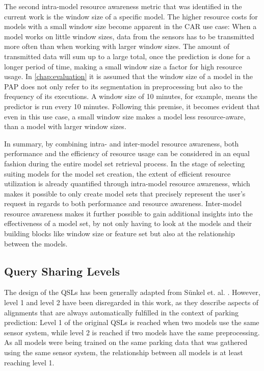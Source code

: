 The second intra-model resource awareness metric that was identified in the current work is the window size of a specific model. The higher resource costs for models with a small window size become apparent in the CAR use case: When a model works on little window sizes, data from the sensors has to be transmitted more often than when working with larger window sizes. The amount of transmitted data will sum up to a large total, once the prediction is done for a longer period of time, making a small window size a factor for high resource usage. In \autoref{chap:evaluation} it is assumed that the window size of a model in the PAP does not only refer to its segmentation in preprocessing but also to the frequency of its executions. A window size of 10 minutes, for example, means the predictor is run every 10 minutes. Following this premise, it becomes evident that even in this use case, a small window size makes a model less resource-aware, than a model with larger window sizes. 

In summary, by combining intra- and inter-model resource awareness, both performance and the efficiency of resource usage can be considered in an equal fashion during the entire model set retrieval process. In the stage of selecting suiting models for the model set creation, the extent of efficient resource utilization is already quantified through intra-model resource awareness, which makes it possible to only create model sets that precisely represent the user's request in regards to both performance and resource awareness. Inter-model resource awareness makes it further possible to gain additional insights into the effectiveness of a model set, by not only having to look at the models and their building blocks like window size or feature set but also at the relationship between the models.

\subsection{Query Sharing Levels}

The design of the QSLs has been generally adapted from Sünkel et. al. \cite{sunkel2022}. However, level 1 and level 2 have been disregarded in this work, as they describe aspects of alignments that are always automatically fulfilled in the context of parking prediction: Level 1 of the original QSLs is reached when two models use the same sensor system, while level 2 is reached if two models have the same preprocessing. As all models were being trained on the same parking data that was gathered using the same sensor system, the relationship between all models is at least reaching level 1.

